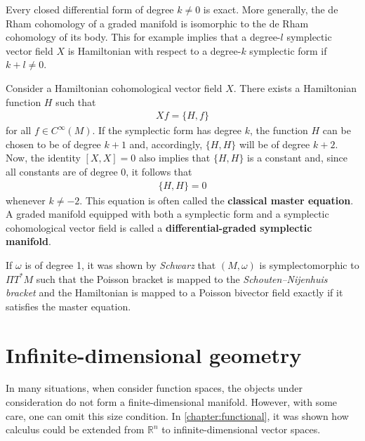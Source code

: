     \begin{property}\label{hdg:global_exactness}
        Every closed differential form of degree $k\neq0$ is exact. More generally, the de Rham cohomology of a graded manifold is isomorphic to the de Rham cohomology of its body. This for example implies that a degree-$l$ symplectic vector field $X$ is Hamiltonian with respect to a degree-$k$ symplectic form if $k+l\neq0$.
    \end{property}
    \begin{result}
        Consider a Hamiltonian cohomological vector field $X$. There exists a Hamiltonian function $H$ such that
        \begin{gather}
            Xf = \{H,f\}
        \end{gather}
        for all $f\in C^\infty(M)$. If the symplectic form has degree $k$, the function $H$ can be chosen to be of degree $k+1$ and, accordingly, $\{H,H\}$ will be of degree $k+2$. Now, the identity $[X,X] = 0$ also implies that $\{H,H\}$ is a constant and, since all constants are of degree 0, it follows that
        \begin{gather}
            \label{hdg:classical_master_equation}
            \{H,H\}=0
        \end{gather}
        whenever $k\neq-2$. This equation is often called the \textbf{classical master equation}. A graded manifold equipped with both a symplectic form and a symplectic cohomological vector field is called a \textbf{differential-graded symplectic manifold}.

        If $\omega$ is of degree 1, it was shown by \textit{Schwarz} that $(M,\omega)$ is symplectomorphic to $\Pi T^*M$ such that the Poisson bracket is mapped to the \textit{Schouten--Nijenhuis bracket} and the Hamiltonian is mapped to a Poisson bivector field exactly if it satisfies the master equation.
    \end{result}

\section{Infinite-dimensional geometry}\label{section:infinite_dimensional}

    In many situations, when consider function spaces, the objects under consideration do not form a finite-dimensional manifold. However, with some care, one can omit this size condition. In \cref{chapter:functional}, it was shown how calculus could be extended from $\mathbb{R}^n$ to infinite-dimensional vector spaces.

